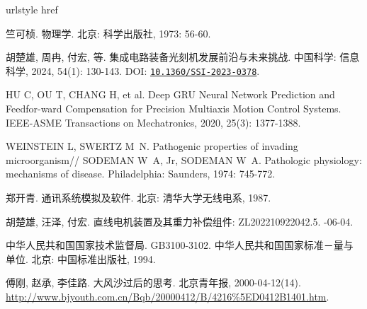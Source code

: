 \documentclass[degree=bachelor]{thuthesis}
\begin{document}
\begin{thebibliography}{8}
\providecommand{\natexlab}[1]{#1}
\providecommand{\url}[1]{#1}
\expandafter\ifx\csname urlstyle\endcsname\relax\else
  \fi
\expandafter\ifx\csname href\endcsname\relax
  \DeclareUrlCommand{}
  \def\eprint#1#2{#2}
\else
  \def\doi#1{\href{https://doi.org/#1}{\nolinkurl{#1}}}
  \let\eprint\href
\fi

竺可桢.
\newblock 物理学\allowbreak[M].
\newblock 北京: 科学出版社, 1973: 56-60.

胡楚雄, 周冉, 付宏, 等.
\newblock 集成电路装备光刻机发展前沿与未来挑战\allowbreak[J].
\newblock 中国科学: 信息科学, 2024, 54(1): 130-143.
\newblock DOI: \doi{10.1360/SSI-2023-0378}.

HU C, OU T, CHANG H, et al.
\newblock Deep GRU Neural Network Prediction and Feedfor-ward Compensation for Precision Multiaxis Motion Control Systems\allowbreak[J].
\newblock IEEE-ASME Transactions on Mechatronics, 2020, 25(3): 1377-1388.

WEINSTEIN L, SWERTZ M~N.
\newblock Pathogenic properties of invading
  microorganism\allowbreak[M]//\allowbreak
SODEMAN W~A, Jr, SODEMAN W~A.
\newblock Pathologic physiology: mechanisms of disease.
\newblock Philadelphia: Saunders, 1974: 745-772.

郑开青.
\newblock 通讯系统模拟及软件\allowbreak[D].
\newblock 北京: 清华大学无线电系, 1987.

胡楚雄, 汪泽, 付宏.
\newblock 直线电机装置及其重力补偿组件: ZL202210922042.5\allowbreak[P].
-06-04.

中华人民共和国国家技术监督局.
\newblock GB3100-3102. 中华人民共和国国家标准－量与单位\allowbreak[S].
\newblock 北京: 中国标准出版社, 1994.

傅刚, 赵承, 李佳路.
\newblock 大风沙过后的思考\allowbreak[N/OL].
\newblock 北京青年报, 2000-04-12\allowbreak (14)\allowbreak[2002-03-06].
\newblock \url{http://www.bjyouth.com.cn/Bqb/20000412/B/4216%5ED0412B1401.htm}.

\end{thebibliography}
\end{document}
